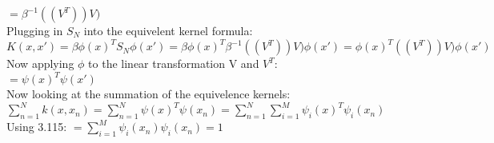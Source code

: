\documentclass[11pt,leqno,fleqn]{article}
\begin{document}
$= \beta^{-1}  ( (V^T))  V)$\\
Plugging in $S_N$ into the equivelent kernel formula:\\
$K(x,x') = \beta \phi(x)^T S_N \phi(x') = \beta \phi(x)^T \beta^{-1}  ( (V^T))  V) \phi(x') = \phi(x)^T ( (V^T))  V) \phi(x') $\\
Now applying $\phi$ to the linear transformation V and $V^T$:\\
$= \psi (x)^T \psi(x')$\\
Now looking at the summation of the equivelence kernels:\\
$\sum_{n=1}^N k(x,x_n) = \sum_{n=1}^N \psi (x)^T \psi(x_n) = \sum_{n=1}^N \sum_{i =1}^M \psi_i (x)^T \psi_i (x_n)$\\
Using 3.115:
$ = \sum_{i =1}^M \psi_i (x_n) \psi_i (x_n) = 1$

\newpage
\end{document}
